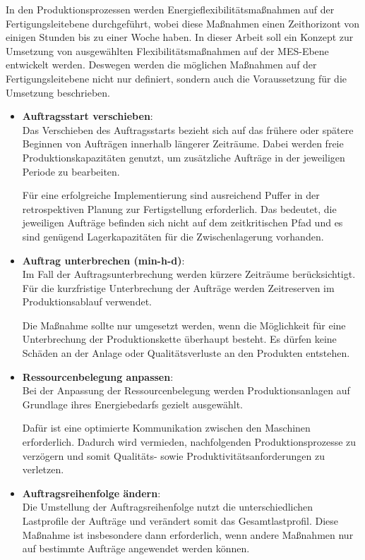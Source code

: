 In den Produktionsprozessen werden Energieflexibilitätsmaßnahmen auf der Fertigungsleitebene durchgeführt, wobei diese Maßnahmen einen Zeithorizont von einigen Stunden bis zu einer Woche haben. In dieser Arbeit soll ein Konzept zur Umsetzung von ausgewählten Flexibilitätsmaßnahmen auf der MES-Ebene entwickelt werden. Deswegen werden die möglichen Maßnahmen auf der Fertigungsleitebene nicht nur definiert, sondern auch die Voraussetzung für die Umsetzung beschrieben. 

\begin{itemize}[label={--}]
	\item \textbf{Auftragsstart verschieben}: \\Das Verschieben des Auftragsstarts bezieht sich auf das frühere oder spätere Beginnen von Aufträgen innerhalb längerer Zeiträume. Dabei werden freie Produktionskapazitäten genutzt, um zusätzliche Aufträge in der jeweiligen Periode zu bearbeiten. 
	
	Für eine erfolgreiche Implementierung sind ausreichend Puffer in der retrospektiven Planung zur Fertigstellung erforderlich. Das bedeutet, die jeweiligen Aufträge befinden sich nicht auf dem zeitkritischen Pfad und es sind genügend Lagerkapazitäten für die Zwischenlagerung vorhanden.
	\item \textbf{Auftrag unterbrechen (min-h-d)}: \\Im Fall der Auftragsunterbrechung werden kürzere Zeiträume berücksichtigt. Für die kurzfristige Unterbrechung der Aufträge werden Zeitreserven im Produktionsablauf verwendet. 
	
	Die Maßnahme sollte nur umgesetzt werden, wenn die Möglichkeit für eine Unterbrechung der Produktionskette überhaupt besteht. Es dürfen keine Schäden an der Anlage oder Qualitätsverluste an den Produkten entstehen. 
	\item \textbf{Ressourcenbelegung anpassen}: \\Bei der Anpassung der Ressourcenbelegung werden Produktionsanlagen auf Grundlage ihres Energiebedarfs gezielt ausgewählt. 
	
	Dafür ist eine optimierte Kommunikation zwischen den Maschinen erforderlich. Dadurch wird vermieden, nachfolgenden Produktionsprozesse zu verzögern und somit Qualitäts- sowie Produktivitätsanforderungen zu verletzen.
	\item \textbf{Auftragsreihenfolge ändern}: \\Die Umstellung der Auftragsreihenfolge nutzt die unterschiedlichen Lastprofile der Aufträge und verändert somit das Gesamtlastprofil. Diese Maßnahme ist insbesondere dann erforderlich, wenn andere Maßnahmen nur auf bestimmte Aufträge angewendet werden können. 
	

\end{itemize}
